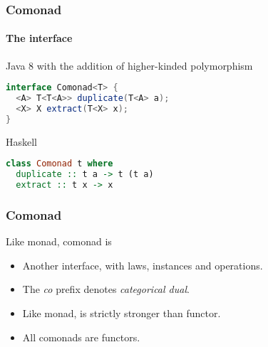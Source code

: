 \begin{frame}[fragile]
\frametitle{Comonad}
\framesubtitle{The interface}
\begin{block}{Java 8 with the addition of higher-kinded polymorphism}
\begin{lstlisting}[style=language,language=java]
interface Comonad<T> {
  <A> T<T<A>> duplicate(T<A> a);
  <X> X extract(T<X> x);
}
\end{lstlisting}
\end{block}
\begin{block}{Haskell}
\begin{lstlisting}[style=language,language=haskell]
class Comonad t where
  duplicate :: t a -> t (t a)
  extract :: t x -> x
\end{lstlisting}
\end{block}
\end{frame}

\begin{frame}[fragile]
\frametitle{Comonad}
\begin{block}{Like monad, comonad is}
\begin{itemize}
\item Another interface, with laws, instances and operations.
\item The \emph{co} prefix denotes \emph{categorical dual}.
\item Like monad, is strictly stronger than functor.
\item All comonads are functors.
\end{itemize}
\end{block}
\end{frame}
